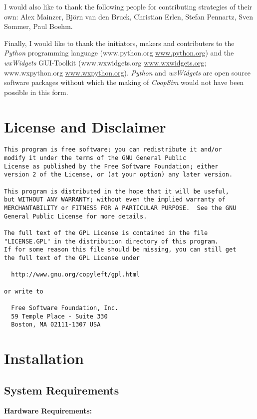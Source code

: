 \documentclass[12pt,a4paper,USenglish]{article}
\begin{document}
I would also like to thank the following people for contributing
strategies of their own: Alex Mainzer, Björn van den Bruck, 
Christian Erlen, Stefan Pennartz, Sven Sommer, Paul Boehm.

Finally, I would like to thank the initiators, makers and contributers
to the \emph{Python} programming language (www.python.org
\url{www.python.org}) and the \emph{wxWidgets} GUI-Toolkit
(www.wxwidgets.org \url{www.wxwidgets.org}; www.wxpython.org
\url{www.wxpython.org}). \emph{Python} and \emph{wxWidgets} are open
source software packages without which the making of \emph{CoopSim}
would not have been possible in this form.

\section{License and Disclaimer}

\begin{verbatim}
This program is free software; you can redistribute it and/or
modify it under the terms of the GNU General Public
License as published by the Free Software Foundation; either
version 2 of the License, or (at your option) any later version.

This program is distributed in the hope that it will be useful,
but WITHOUT ANY WARRANTY; without even the implied warranty of
MERCHANTABILITY or FITNESS FOR A PARTICULAR PURPOSE.  See the GNU
General Public License for more details.

The full text of the GPL License is contained in the file 
"LICENSE.GPL" in the distribution directory of this program. 
If for some reason this file should be missing, you can still get 
the full text of the GPL License under 

  http://www.gnu.org/copyleft/gpl.html 
  
or write to 

  Free Software Foundation, Inc.
  59 Temple Place - Suite 330
  Boston, MA 02111-1307 USA
\end{verbatim}

\section{Installation}

\subsection{System Requirements}

\noindent \textbf{Hardware Requirements:}
\end{document}
